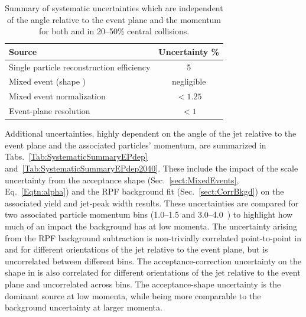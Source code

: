 \begin{table}[!htbp]
	\caption[Systematic uncertainties independent of the jet orientation]{Summary of systematic uncertainties which are independent of the angle relative to the event plane and the momentum for both  and  in 20--50\% central \AuAu collisions.}
	\label{Tab:SystematicSummary}
	\centering %
	\begin{tabular}{l | c} %
		\hline %
		Source & Uncertainty \% \Tstrut \Bstrut \\ %
		\hline %
		Single particle reconstruction efficiency & 5 \\
		\hline
		Mixed event (shape \dphi) & negligible \\
		\hline
		Mixed event normalization & $< 1.25$ \\ 
		\hline
		Event-plane resolution &  $< 1$ \\ 
		\hline
	\end{tabular}
\end{table}

Additional uncertainties, highly dependent on the angle of the jet relative to the event plane and the associated particles' momentum, are summarized in Tabs.~\ref{Tab:SystematicSummaryEPdep} and~\ref{Tab:SystematicSummaryEPdep2040}.  These include the impact of the scale uncertainty from the acceptance shape (Sec.~\ref{sect:MixedEvents}, Eq.~\ref{Eqtn:alpha}) and the RPF background fit (Sec.~\ref{sect:CorrBkgd}) on the associated yield and jet-peak width results.  These uncertainties are compared for two associated particle momentum bins (1.0--1.5 and 3.0--4.0~\GeVc) to highlight how much of an impact the background has at low momenta.  The uncertainty arising from the RPF background subtraction is non-trivially correlated point-to-point in \dphi and for different orientations of the jet relative to the event plane, but is uncorrelated between different  bins.  The acceptance-correction uncertainty on the shape in \deta is also correlated for different orientations of the jet relative to the event plane and uncorrelated across  bins.  The acceptance-shape uncertainty is the dominant source at low momenta, while being more comparable to the background uncertainty at larger momenta.  

